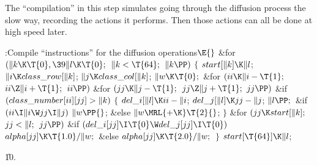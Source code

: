 The ``compilation'' in this step simulates going through
the diffusion
process the slow way, recording the actions it performs. Then those actions
can all be done at high speed later.

\Y\B\4:Compile ``instructions'' for the diffusion operations\X${}\E{}$\6
\&{for} ${}(\|k\K\T{0},\39\|l\K\T{0};{}$ ${}\|k<\T{64};{}$ ${}\|k\PP){}$\5
${}\{{}$\1\6
${}\\{start}[\|k]\K\|l{}$;\6
${}\|i\K\\{class\_row}[\|k]{}$;\5
${}\|j\K\\{class\_col}[\|k]{}$;\5
${}\|w\K\T{0};{}$\6
\&{for} ${}(\\{ii}\K\|i-\T{1};{}$ ${}\\{ii}\Z\|i+\T{1};{}$ ${}\\{ii}\PP){}$\1\6
\&{for} ${}(\\{jj}\K\|j-\T{1};{}$ ${}\\{jj}\Z\|j+\T{1};{}$ ${}\\{jj}\PP){}$\1\6
\&{if} ${}(\\{class\_number}[\\{ii}][\\{jj}]>\|k){}$\5
${}\{{}$\1\6
${}\\{del\_i}[\|l]\K\\{ii}-\|i{}$;\5
${}\\{del\_j}[\|l]\K\\{jj}-\|j{}$;\5
${}\|l\PP;{}$\6
\&{if} ${}(\\{ii}\I\|i\W\\{jj}\I\|j){}$\1\5
${}\|w\PP{}$;\2\6
\&{else}\1\5
${}\|w\MRL{+{\K}}\T{2}{}$;\2\6
\4${}\}{}$\2\2\2\6
\&{for} ${}(\\{jj}\K\\{start}[\|k];{}$ ${}\\{jj}<\|l;{}$ ${}\\{jj}\PP){}$\1\6
\&{if} ${}(\\{del\_i}[\\{jj}]\I\T{0}\W\\{del\_j}[\\{jj}]\I\T{0}){}$\1\5
${}\\{alpha}[\\{jj}]\K\T{1.0}/\|w;{}$\2\6
\&{else}\1\5
${}\\{alpha}[\\{jj}]\K\T{2.0}/\|w;{}$\2\2\6
\4${}\}{}$\2\6
${}\\{start}[\T{64}]\K\|l{}$;\par
\U10.\fi

